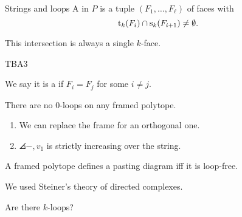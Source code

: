 \begin{frame}{Strings and loops}
	\pause
	A  in $P$ is a tuple $(F_1,\dots,F_\ell)$ of faces with
	\[
	\operatorname{t}_k(F_i) \cap \operatorname{s}_k(F_{i+1}) \neq \emptyset.
	\]

	\pause
	 This intersection is always a single $k$-face.

	\pause\medskip
	 TBA3

	\pause\medskip
	We say it is a  if $F_i = F_j$ for some $i \neq j$.

	\pause\medskip
	There are no $0$-loops on any framed polytope.
	\pause
	\begin{enumerate}
		\item We can replace the frame for an orthogonal one.
		\item $\angles{-, v_1}$ is strictly increasing over the string.
	\end{enumerate}

	\pause\medskip
	 A framed polytope defines a pasting diagram iff it is loop-free.

	\pause\medskip
	 We used Steiner's theory of directed complexes.

	\pause\medskip
	 Are there $k$-loops?

\end{frame}


